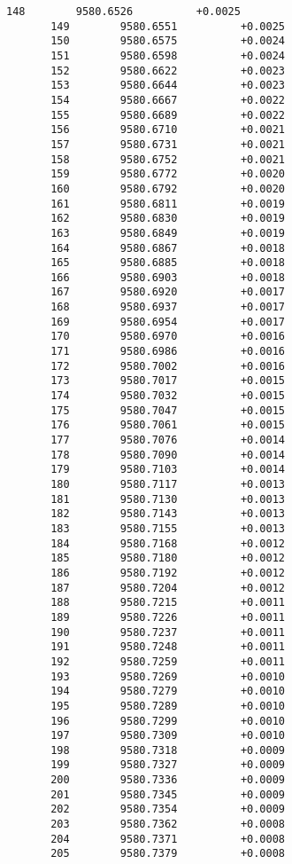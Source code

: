 \documentclass[11pt]{article}
\begin{document}
\begin{Verbatim}[commandchars=\\\{\}]
       148        9580.6526          +0.0025
       149        9580.6551          +0.0025
       150        9580.6575          +0.0024
       151        9580.6598          +0.0024
       152        9580.6622          +0.0023
       153        9580.6644          +0.0023
       154        9580.6667          +0.0022
       155        9580.6689          +0.0022
       156        9580.6710          +0.0021
       157        9580.6731          +0.0021
       158        9580.6752          +0.0021
       159        9580.6772          +0.0020
       160        9580.6792          +0.0020
       161        9580.6811          +0.0019
       162        9580.6830          +0.0019
       163        9580.6849          +0.0019
       164        9580.6867          +0.0018
       165        9580.6885          +0.0018
       166        9580.6903          +0.0018
       167        9580.6920          +0.0017
       168        9580.6937          +0.0017
       169        9580.6954          +0.0017
       170        9580.6970          +0.0016
       171        9580.6986          +0.0016
       172        9580.7002          +0.0016
       173        9580.7017          +0.0015
       174        9580.7032          +0.0015
       175        9580.7047          +0.0015
       176        9580.7061          +0.0015
       177        9580.7076          +0.0014
       178        9580.7090          +0.0014
       179        9580.7103          +0.0014
       180        9580.7117          +0.0013
       181        9580.7130          +0.0013
       182        9580.7143          +0.0013
       183        9580.7155          +0.0013
       184        9580.7168          +0.0012
       185        9580.7180          +0.0012
       186        9580.7192          +0.0012
       187        9580.7204          +0.0012
       188        9580.7215          +0.0011
       189        9580.7226          +0.0011
       190        9580.7237          +0.0011
       191        9580.7248          +0.0011
       192        9580.7259          +0.0011
       193        9580.7269          +0.0010
       194        9580.7279          +0.0010
       195        9580.7289          +0.0010
       196        9580.7299          +0.0010
       197        9580.7309          +0.0010
       198        9580.7318          +0.0009
       199        9580.7327          +0.0009
       200        9580.7336          +0.0009
       201        9580.7345          +0.0009
       202        9580.7354          +0.0009
       203        9580.7362          +0.0008
       204        9580.7371          +0.0008
       205        9580.7379          +0.0008

\end{Verbatim}
\end{document}
